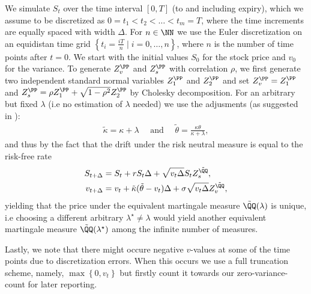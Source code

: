 \documentclass[11pt]{article}
\numberwithin{equation}{section}
\newcommand{\lc}{\left\{}
\newcommand{\rc}{\right\}}
\begin{document}
We simulate $S_t$ over the time interval $[0, T]$ (to
and including expiry),
which we assume to be discretized as $0 = t_1 < t_2 < \ldots < t_m = T$, where
the time increments are equally spaced with width $\Delta$. For $n\in\NN$ we use
the Euler discretization on an equidistan time grid $\lc t_i=\frac{iT}{n}\mid
i=0,\ldots,n\rc$, where $n$ is the number of time points after $t=0$. We start with the initial
values $S_0$ for the stock price and $v_0$ for the variance. To generate
$Z_v^\PP$ and $Z_s^\PP$ with correlation $\rho$, we first generate two
independent standard normal variables $Z_1^\PP$ and $Z_2^\PP$ and set $Z_v^\PP
= Z_1^\PP$ and $Z_s^\PP = \rho Z_1^\PP + \sqrt{1 - \rho^2} Z_2^\PP$ by Cholesky decomposition.
For an arbitrary but fixed $\lambda$ (i.e no estimation of $\lambda$ needed) we
use the adjusments (as suggested in \cite{heston1993closed}):
\begin{align*}
    \tilde{\kappa}=\kappa+\lambda \quad \text{ and } \quad \tilde{\theta}=\frac{\kappa\theta}{\kappa + \lambda},
\end{align*}
and thus by the fact that the drift under the risk neutral measure is equal to
the risk-free rate
\begin{align*}
    S_{t+\Delta}&=S_t+rS_t\Delta+\sqrt{v_t \Delta}S_t Z_s^{\tilde{\QQ}},\\
    v_{t+\Delta} &= v_t +\tilde{\kappa}(\tilde{\theta} - v_t)\Delta + \sigma \sqrt{v_t \Delta}Z_v^{\tilde{\QQ}},
\end{align*}
yielding that the price under the equivalent martingale measure
$\tilde{\QQ}(\lambda)$ is unique, i.e choosing a different arbitrary
$\lambda^\star\neq \lambda$ would yield another equivalent martingale measure
$\tilde{\QQ}(\lambda^\star)$ among the infinite number of measures.

Lastly, we note that there might occure negative $v$-values at some of the time
points due to discretization errors. When
this occurs we use a full truncation scheme, namely, $\max\lc 0,v_t\rc$ but
firstly count it towards
our zero-variance-count for later reporting.
\newpage
\end{document}
